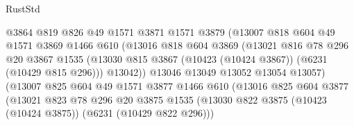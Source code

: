 \begin{lexlean}{RustStd}
\begin{coremodule}
{{                                @3864
                                @819
                                @826
                                @49
                                @1571
                                @3871
                                @1571
                                @3879
                                (@13007
                                  @818
                                  @604
                                  @49
                                  @1571
                                  @3869
                                  @1466
                                  @610
                                  (@13016
                                    @818
                                    @604
                                    @3869
                                    (@13021
                                      @816
                                      @78
                                      @296
                                      @20
                                      @3867
                                      @1535
                                      (@13030
                                        @815
                                        @3867
                                        (@10423 (@10424 @3867))
                                        (@6231 (@10429 @815 @296)))
                                      @13042))
                                  @13046
                                  @13049
                                  @13052
                                  @13054
                                  @13057)
                                (@13007
                                  @825
                                  @604
                                  @49
                                  @1571
                                  @3877
                                  @1466
                                  @610
                                  (@13016
                                    @825
                                    @604
                                    @3877
                                    (@13021
                                      @823
                                      @78
                                      @296
                                      @20
                                      @3875
                                      @1535
                                      (@13030
                                        @822
                                        @3875
                                        (@10423 (@10424 @3875))
                                        (@6231 (@10429 @822 @296)))
}}
\end{coremodule}
\end{lexlean}
